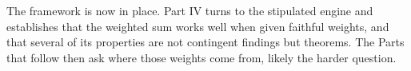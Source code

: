 The framework is now in place. Part IV turns to the stipulated engine and
establishes that the weighted sum works well when given faithful weights, and that several of its properties are not contingent findings but
theorems. The Parts that follow then ask where those weights come from, likely the
harder question.
